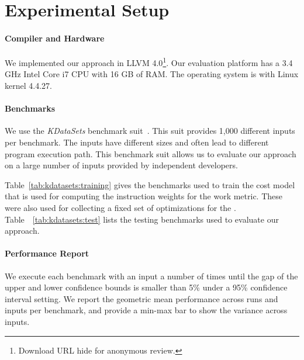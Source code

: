 \section{Experimental Setup}
\paragraph{Compiler and Hardware} We implemented our approach in LLVM 4.0\footnote{Download URL hide for anonymous review.}. Our evaluation platform has a  3.4 GHz Intel Core i7 CPU with 16 GB of RAM. The
operating system is  with Linux kernel 4.4.27.


\paragraph{Benchmarks}
We use the \textit{KDataSets} benchmark suit~\cite{chen10,chen12a}. This suit provides 1,000 different inputs per benchmark. The inputs
have different sizes and often lead to different program execution path.
This benchmark suit allows us to evaluate our approach on a large number of inputs provided by independent
developers.



Table~\ref{tab:kdatasets:training} gives the benchmarks used to train the cost model that is used for computing the instruction weights for
the work metric. These were also used for collecting a fixed set of optimizations for the {\itercomp}. Table~~\ref{tab:kdatasets:test}
lists the testing benchmarks used to evaluate our approach.


\paragraph{Performance Report}
We execute each benchmark with an input a number of times until the gap of the upper and lower confidence bounds is smaller than 5\% under
a 95\% confidence interval setting. We report the geometric mean performance across runs and inputs per benchmark, and provide a min-max
bar to show the variance across inputs.


